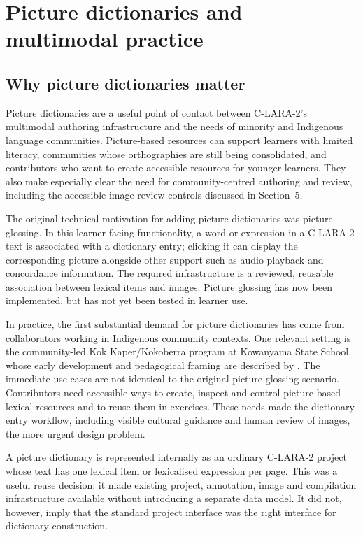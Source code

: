 \section{Picture dictionaries and multimodal practice}

\subsection{Why picture dictionaries matter}

Picture dictionaries are a useful point of contact between C-LARA-2's
multimodal authoring infrastructure and the needs of minority and Indigenous
language communities. Picture-based resources can support learners with
limited literacy, communities whose orthographies are still being consolidated,
and contributors who want to create accessible resources for younger learners.
They also make especially clear the need for community-centred authoring
and review, including the accessible image-review controls discussed in
Section~5.

The original technical motivation for adding picture dictionaries was picture
glossing. In this learner-facing functionality, a word or expression in a
C-LARA-2 text is associated with a dictionary entry; clicking it can display
the corresponding picture alongside other support such as audio playback and
concordance information. The required infrastructure is a reviewed, reusable
association between lexical items and images. Picture glossing has now been
implemented, but has not yet been tested in learner use.

In practice, the first substantial demand for picture dictionaries has come
from collaborators working in Indigenous community contexts. One relevant
setting is the community-led Kok Kaper/Kokoberra program at Kowanyama State
School, whose early development and pedagogical framing are described by
\citet{RendinaEtAl2026}. The immediate use cases are not identical to the
original picture-glossing scenario. Contributors need accessible ways to
create, inspect and control picture-based lexical resources and to reuse them
in exercises. These needs made the dictionary-entry workflow, including visible
cultural guidance and human review of images, the more urgent design problem.

A picture dictionary is represented internally as an ordinary C-LARA-2 project
whose text has one lexical item or lexicalised expression per page. This was a
useful reuse decision: it made existing project, annotation, image and
compilation infrastructure available without introducing a separate data
model. It did not, however, imply that the standard project interface was the
right interface for dictionary construction.

